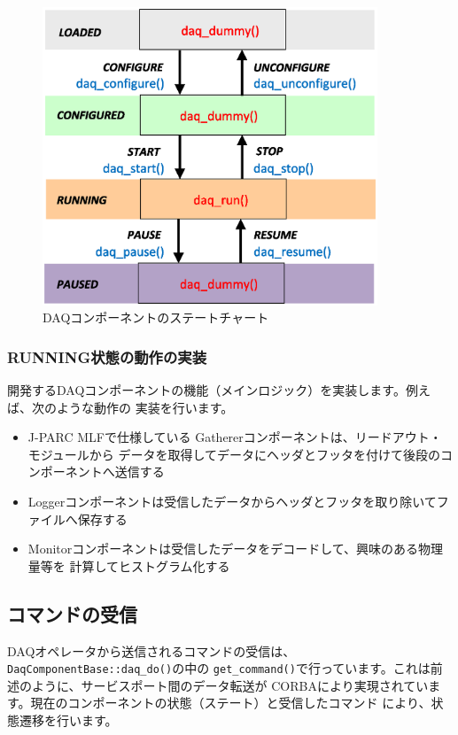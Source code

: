 \documentclass[a4j,10pt,dvips,onecolumn,oneside,final]{jarticle}%
\begin{document}
\begin{figure}[htbp]
 \begin{center}
  \includegraphics[width=100mm]{state-func.eps}
  \caption{DAQコンポーネントのステートチャート}
  \label{state-func.fig}
 \end{center}
\end{figure}

\subsubsection{RUNNING状態の動作の実装}
開発するDAQコンポーネントの機能（メインロジック）を実装します。例えば、次のような動作の
実装を行います。
\begin{itemize}
\item J-PARC MLFで仕様している Gathererコンポーネントは、リードアウト・モジュールから
  データを取得してデータにヘッダとフッタを付けて後段のコンポーネントへ送信する
\item Loggerコンポーネントは受信したデータからヘッダとフッタを取り除いてファイルへ保存する
\item Monitorコンポーネントは受信したデータをデコードして、興味のある物理量等を
  計算してヒストグラム化する
\end{itemize}

\subsection{コマンドの受信}
DAQオペレータから送信されるコマンドの受信は、\verb|DaqComponentBase::daq_do()|の中の 
\verb|get_command()|で行っています。これは前述のように、サービスポート間のデータ転送が
CORBAにより実現されています。現在のコンポーネントの状態（ステート）と受信したコマンド
により、状態遷移を行います。
\end{document}
